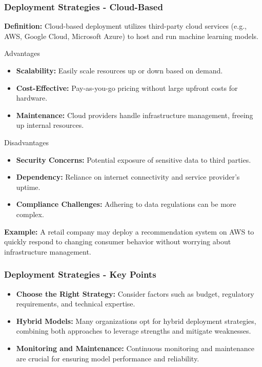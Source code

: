 \documentclass[aspectratio=169]{beamer}
\begin{document}
\begin{frame}[fragile]
    \frametitle{Deployment Strategies - Cloud-Based}
    \textbf{Definition:} Cloud-based deployment utilizes third-party cloud services (e.g., AWS, Google Cloud, Microsoft Azure) to host and run machine learning models.

    \begin{block}{Advantages}
        \begin{itemize}
            \item \textbf{Scalability:} Easily scale resources up or down based on demand.
            \item \textbf{Cost-Effective:} Pay-as-you-go pricing without large upfront costs for hardware.
            \item \textbf{Maintenance:} Cloud providers handle infrastructure management, freeing up internal resources.
        \end{itemize}
    \end{block}

    \begin{block}{Disadvantages}
        \begin{itemize}
            \item \textbf{Security Concerns:} Potential exposure of sensitive data to third parties.
            \item \textbf{Dependency:} Reliance on internet connectivity and service provider's uptime.
            \item \textbf{Compliance Challenges:} Adhering to data regulations can be more complex.
        \end{itemize}
    \end{block}

    \textbf{Example:} A retail company may deploy a recommendation system on AWS to quickly respond to changing consumer behavior without worrying about infrastructure management.
\end{frame}

\begin{frame}[fragile]
    \frametitle{Deployment Strategies - Key Points}
    \begin{itemize}
        \item \textbf{Choose the Right Strategy:} Consider factors such as budget, regulatory requirements, and technical expertise.
        \item \textbf{Hybrid Models:} Many organizations opt for hybrid deployment strategies, combining both approaches to leverage strengths and mitigate weaknesses.
        \item \textbf{Monitoring and Maintenance:} Continuous monitoring and maintenance are crucial for ensuring model performance and reliability.
    \end{itemize}
\end{frame}
\end{document}

